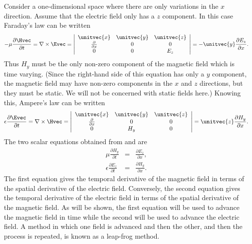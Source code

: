 Consider a one-dimensional space where there are only variations in
the $x$ direction.  Assume that the electric field only has a $z$
component.  In this case Faraday's law can be written
\begin{equation}
  -\mu \frac{\partial \Hvec}{\partial t} =
  \nabla \times \Evec =
  \left|
  \begin{array}{ccc}
     \unitvec{x} & \unitvec{y} & \unitvec{z} \\
     \frac{\partial}{\partial x} & 0 & 0 \\
     0 & 0 & E_z
  \end{array}
  \right|
  = -\unitvec{y}\frac{\partial E_z}{\partial x}.
 \label{eq:faradayVec}
\end{equation}
Thus $H_y$ must be the only non-zero component of the magnetic field
which is time varying.  (Since the right-hand side of this equation
has only a $y$ component, the magnetic field may have non-zero
components in the $x$ and $z$ directions, but they must be static.  We
will not be concerned with static fields here.)  Knowing this,
Ampere's law can be written
\begin{equation}
  \epsilon \frac{\partial \Evec}{\partial t} =
  \nabla \times \Hvec =
  \left|
  \begin{array}{ccc}
     \unitvec{x} & \unitvec{y} & \unitvec{z} \\
     \frac{\partial}{\partial x} & 0 & 0 \\
     0 & H_y & 0
  \end{array}
  \right|
  = \unitvec{z}\frac{\partial H_y}{\partial x}.
 \label{eq:ampereVec}
\end{equation}
The two scalar equations obtained from  and
 are
\begin{eqnarray}
  \mu \frac{\partial H_y}{\partial t} &=&
    \frac{\partial E_z}{\partial x},  \label{eq:faradayScalar}
  \\
  \epsilon \frac{\partial E_z}{\partial t} &=&
    \frac{\partial H_y}{\partial x}. \label{eq:ampereScalar}
\end{eqnarray}
The first equation gives the temporal derivative of the magnetic field
in terms of the spatial derivative of the electric field.  Conversely,
the second equation gives the temporal derivative of the electric
field in terms of the spatial derivative of the magnetic field.  As
will be shown, the first equation will be used to advance the magnetic
field in time while the second will be used to advance the electric
field.  A method in which one field is advanced and then the other,
and then the process is repeated, is known as a leap-frog method.

